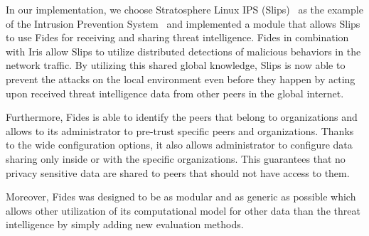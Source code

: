 In our implementation, we choose Stratosphere Linux IPS (Slips)~\cite{slips} as the example of the Intrusion Prevention System~\cite{zhang2004intrusion} and implemented a module that allows Slips to use Fides for receiving and sharing threat intelligence. Fides in combination with Iris allow Slips to utilize distributed detections of malicious behaviors in the network traffic.
By utilizing this shared global knowledge, Slips is now able to prevent the attacks on the local environment even before they happen by acting upon received threat intelligence data from other peers in the global internet.

Furthermore, Fides is able to identify the peers that belong to organizations and allows to its administrator to pre-trust specific peers and organizations. Thanks to the wide configuration options, it also allows administrator to configure data sharing only inside or with the specific organizations. This guarantees that no privacy sensitive data are shared to peers that should not have access to them.

Moreover, Fides was designed to be as modular and as generic as possible which allows other utilization of its computational model for other data than the threat intelligence by simply adding new evaluation methods.




